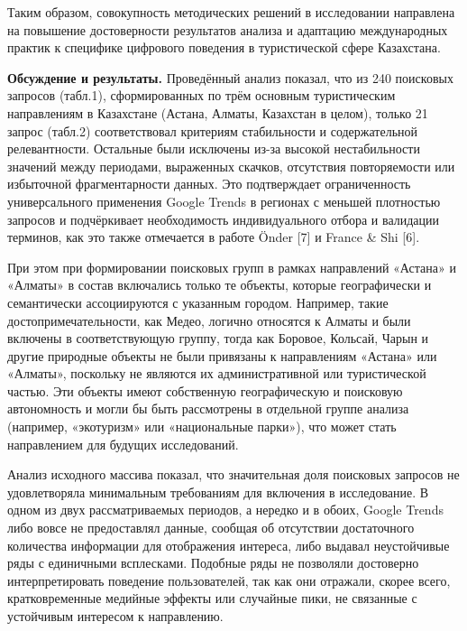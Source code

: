 \begin{multicols}{2}
Таким образом, совокупность методических решений в исследовании
направлена на повышение достоверности результатов анализа и адаптацию
международных практик к специфике цифрового поведения в туристической
сфере Казахстана.

{\bfseries Обсуждение и результаты.} Проведённый анализ показал, что из 240
поисковых запросов (табл.1), сформированных по трём основным
туристическим направлениям в Казахстане (Астана, Алматы, Казахстан в
целом), только 21 запрос (табл.2) соответствовал критериям стабильности
и содержательной релевантности. Остальные были исключены из-за высокой
нестабильности значений между периодами, выраженных скачков, отсутствия
повторяемости или избыточной фрагментарности данных. Это подтверждает
ограниченность универсального применения Google Trends в регионах с
меньшей плотностью запросов и подчёркивает необходимость индивидуального
отбора и валидации терминов, как это также отмечается в работе Önder
{[}7{]} и France \& Shi {[}6{]}.

При этом при формировании поисковых групп в рамках направлений «Астана»
и «Алматы» в состав включались только те объекты, которые географически
и семантически ассоциируются с указанным городом. Например, такие
достопримечательности, как Медео, логично относятся к Алматы и были
включены в соответствующую группу, тогда как Боровое, Кольсай, Чарын и
другие природные объекты не были привязаны к направлениям «Астана» или
«Алматы», поскольку не являются их административной или туристической
частью. Эти объекты имеют собственную географическую и поисковую
автономность и могли бы быть рассмотрены в отдельной группе анализа
(например, «экотуризм» или «национальные парки»), что может стать
направлением для будущих исследований.

Анализ исходного массива показал, что значительная доля поисковых
запросов не удовлетворяла минимальным требованиям для включения в
исследование. В одном из двух рассматриваемых периодов, а нередко и в
обоих, Google Trends либо вовсе не предоставлял данные, сообщая об
отсутствии достаточного количества информации для отображения интереса,
либо выдавал неустойчивые ряды с единичными всплесками. Подобные ряды не
позволяли достоверно интерпретировать поведение пользователей, так как
они отражали, скорее всего, кратковременные медийные эффекты или
случайные пики, не связанные с устойчивым интересом к направлению.
\end{multicols}
\newpage
{}
